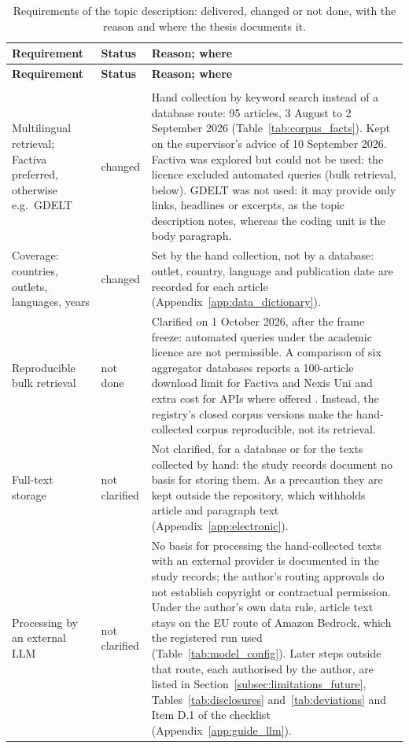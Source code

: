 \begingroup\scriptsize
\setlength{\tabcolsep}{4pt}
\begin{longtable}{@{}>{\raggedright\arraybackslash}p{32mm}>{\raggedright\arraybackslash}p{14mm}>{\raggedright\arraybackslash}p{106mm}@{}}
\caption[Requirements of the topic description]{Requirements of the topic description: delivered, changed or not done, with the reason and where the thesis documents it.}\label{tab:topic_requirements} \\
\toprule
\textbf{Requirement} & \textbf{Status} & \textbf{Reason; where} \\
\midrule
\endfirsthead
\toprule
\textbf{Requirement} & \textbf{Status} & \textbf{Reason; where} \\
\midrule
\endhead
\bottomrule
\endfoot
\multicolumn{3}{@{}l}{\emph{Data source and retrieval}} \\
Multilingual retrieval; Factiva preferred, otherwise e.g.\ GDELT & changed & Hand collection by keyword search instead of a database route: 95 articles, 3 August to 2 September 2026 (Table~\ref{tab:corpus_facts}). Kept on the supervisor's advice of 10 September 2026. Factiva was explored but could not be used: the licence excluded automated queries (bulk retrieval, below). GDELT was not used: it may provide only links, headlines or excerpts, as the topic description notes, whereas the coding unit is the body paragraph. \\
Coverage: countries, outlets, languages, years & changed & Set by the hand collection, not by a database: outlet, country, language and publication date are recorded for each article (Appendix~\ref{app:data_dictionary}). \\
Reproducible bulk retrieval & not done & Clarified on 1 October 2026, after the frame freeze: automated queries under the academic licence are not permissible. A comparison of six aggregator databases reports a 100-article download limit for Factiva and Nexis Uni and extra cost for APIs where offered \parencite{gilbert2024newsaggregators}. Instead, the registry's closed corpus versions make the hand-collected corpus reproducible, not its retrieval. \\
Full-text storage & not clarified & Not clarified, for a database or for the texts collected by hand: the study records document no basis for storing them. As a precaution they are kept outside the repository, which withholds article and paragraph text (Appendix~\ref{app:electronic}). \\
Processing by an external LLM & not clarified & No basis for processing the hand-collected texts with an external provider is documented in the study records; the author's routing approvals do not establish copyright or contractual permission. Under the author's own data rule, article text stays on the EU route of Amazon Bedrock, which the registered run used (Table~\ref{tab:model_config}). Later steps outside that route, each authorised by the author, are listed in Section~\ref{subsec:limitations_future}, Tables~\ref{tab:disclosures} and~\ref{tab:deviations} and Item D.1 of the checklist (Appendix~\ref{app:guide_llm}). \\

\end{longtable}
